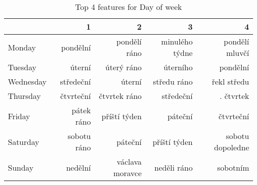 \begin{table}
\centering
\caption{Top 4 features for Day of week}
\label{tab:top4_day_of_week}
\begin{tabular}{lrrrr}
\toprule
{} &            1 &                2 &               3 &                 4 \\
\midrule
Monday    &     pondělní &     pondělí ráno &  minulého týdne &    pondělí mluvčí \\
Tuesday   &       úterní &       úterý ráno &        úterního &          pondělní \\
Wednesday &    středeční &           úterní &     středu ráno &       řekl středu \\
Thursday  &    čtvrteční &     čtvrtek ráno &       středeční &         . čtvrtek \\
Friday    &   pátek ráno &     příští týden &         páteční &         čtvrteční \\
Saturday  &  sobotu ráno &          páteční &    příští týden &  sobotu dopoledne \\
Sunday    &      nedělní &  václava moravce &     neděli ráno &          sobotním \\
\bottomrule
\end{tabular}
\end{table}
